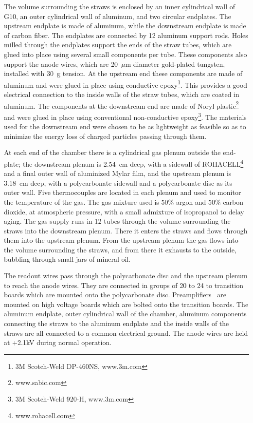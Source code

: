 The volume surrounding the straws is enclosed by an inner cylindrical wall of G10, an outer cylindrical wall of aluminum, and two circular endplates. 
The upstream endplate is made of aluminum, while the downstream endplate is made of carbon fiber. The endplates are connected by 12 aluminum support rods. 
Holes milled through the endplates support the ends of the straw tubes, which are glued into place using several small components per tube.  
These components also support the anode wires, which are 20~$\mu$m diameter gold-plated tungsten, installed with 30~g tension.
At the upstream end these components are made of aluminum and were glued in place using conductive epoxy\footnote{3M Scotch-Weld DP-460NS, www.3m.com}. 
This provides a good electrical connection to the inside walls of the straw tubes, which are coated in aluminum.
The components at the downstream end are made of Noryl plastic\footnote{www.sabic.com} and were glued in place using conventional non-conductive epoxy\footnote{3M Scotch-Weld 920-H, www.3m.com}.
The materials used for the downstream end were chosen to be as lightweight as feasible so as to minimize the energy loss of charged particles passing through them. 

At each end of the chamber there is a cylindrical gas plenum outside the end-plate; the downstream plenum is 2.54~cm deep, with a sidewall of ROHACELL\footnote{www.rohacell.com} and a final outer wall of aluminized Mylar film, and the upstream plenum is 3.18~cm deep, with a polycarbonate sidewall and a polycarbonate disc as its outer wall. 
Five thermocouples are located in each plenum and used to monitor the temperature of the gas.
The gas mixture used is 50$\%$ argon and 50$\%$ carbon dioxide, at atmospheric pressure, with a small admixture of isopropanol to delay aging.
The gas supply runs in 12 tubes through the volume surrounding the straws into the downstream plenum. 
There it enters the straws and flows through them into the upstream plenum. From the upstream plenum the gas flows into the volume surrounding the straws, and from there it exhausts to the outside, bubbling through small jars of mineral oil.

The readout wires pass through the polycarbonate disc and the upstream plenum to reach the anode wires. 
They are connected in groups of 20 to 24 to transition boards which are mounted onto the polycarbonate disc. 
Preamplifiers~\cite{hdnote2515} are mounted on high voltage boards which are bolted onto the transition boards. The aluminum endplate, outer cylindrical wall of the chamber, aluminum components connecting the straws to the aluminum endplate and the inside walls of the straws are all connected to a common electrical ground. 
The anode wires are held at +2.1kV during normal operation. 


